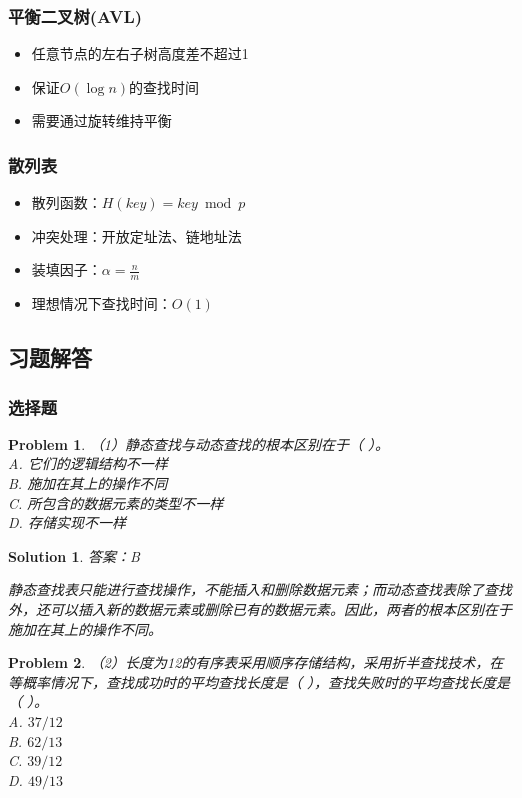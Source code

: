 \documentclass[12pt,a4paper]{amsart}
\newtheorem{problem}{Problem}[section]
\newtheorem{solution}{Solution}[section]
\begin{document}
\subsubsection{平衡二叉树(AVL)}
\begin{itemize}
\item 任意节点的左右子树高度差不超过1
\item 保证$O(\log n)$的查找时间
\item 需要通过旋转维持平衡
\end{itemize}

\subsubsection{散列表}
\begin{itemize}
\item 散列函数：$H(key) = key \bmod p$
\item 冲突处理：开放定址法、链地址法
\item 装填因子：$\alpha = \frac{n}{m}$
\item 理想情况下查找时间：$O(1)$
\end{itemize}

\subsection{习题解答}

\subsubsection{选择题}

\begin{problem}
（1）静态查找与动态查找的根本区别在于（ ）。\\
A. 它们的逻辑结构不一样\\
B. 施加在其上的操作不同\\
C. 所包含的数据元素的类型不一样\\
D. 存储实现不一样
\end{problem}

\begin{solution}
答案：B

静态查找表只能进行查找操作，不能插入和删除数据元素；而动态查找表除了查找外，还可以插入新的数据元素或删除已有的数据元素。因此，两者的根本区别在于施加在其上的操作不同。
\end{solution}

\begin{problem}
（2）长度为12的有序表采用顺序存储结构，采用折半查找技术，在等概率情况下，查找成功时的平均查找长度是（ ），查找失败时的平均查找长度是（ ）。\\
A. $37/12$\\
B. $62/13$\\
C. $39/12$\\
D. $49/13$
\end{problem}
\end{document}

